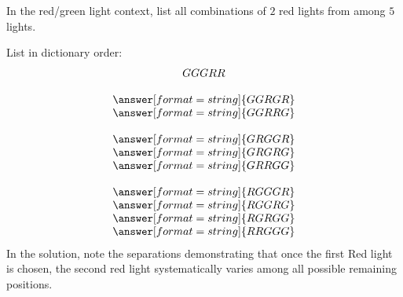 \documentclass[nooutcomes]{ximera}
\begin{document}
\newpage
\begin{problem}
In the red/green light context, list all combinations of $2$ red lights from among $5$ lights.    
\begin{solution}
List in dictionary order: 
\[
\begin{array}{c}
GGGRR \\ \\
\answer[format=string]{GGRGR} \\
\answer[format=string]{GGRRG} \\ \\
\answer[format=string]{GRGGR} \\
\answer[format=string]{GRGRG} \\
\answer[format=string]{GRRGG} \\ \\
\answer[format=string]{RGGGR} \\
\answer[format=string]{RGGRG} \\
\answer[format=string]{RGRGG} \\
\answer[format=string]{RRGGG}
\end{array}
\]
In the solution, note the separations demonstrating that once the first Red light is chosen, the second red light systematically varies among all possible remaining positions.  
\end{solution}
\end{problem}
\end{document}
